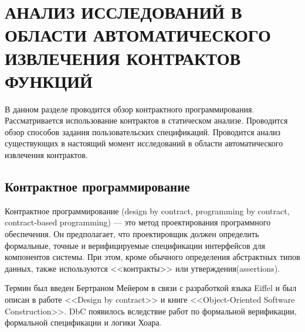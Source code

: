 \chapter{АНАЛИЗ ИССЛЕДОВАНИЙ В ОБЛАСТИ АВТОМАТИЧЕСКОГО ИЗВЛЕЧЕНИЯ КОНТРАКТОВ ФУНКЦИЙ}
\label{chapter:analysis}
В данном разделе проводится обзор контрактного программирования. Рассматривается использование контрактов в статическом анализе. Проводится обзор способов задания пользовательских спецификаций. Проводится анализ существующих в настоящий момент исследований в области автоматического извлечения контрактов.

\section{Контрактное программирование}
Контрактное программирование (design by contract, programming by contract, contract-based programming) --- это метод проектирования программного обеспечения. Он предполагает, что проектировщик должен определить формальные, точные и верифицируемые спецификации интерфейсов для компонентов системы. При этом, кроме обычного определения абстрактных типов данных, также используются <<контракты>> или утверждения(assertions).

Термин был введен Бертраном Мейером в связи с разработкой языка Eiffel и был описан в работе <<Design by contract>>\cite{designByContract} и книге <<Object-Oriented Software Construction>>\cite{oosc-meyer}. DbC появилось вследствие работ по формальной верификации, формальной спецификации и логики Хоара.

